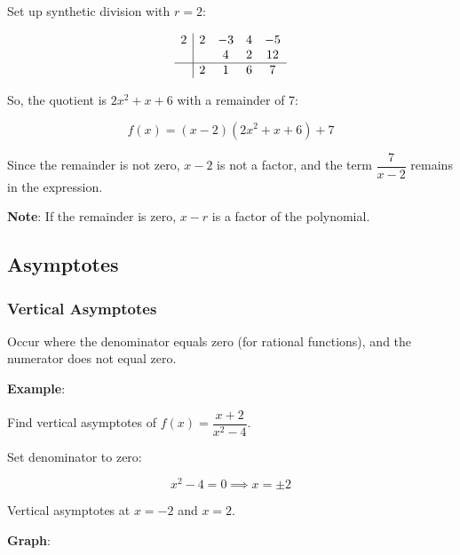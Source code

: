 \documentclass{article}
\begin{document}
\begin{multicols}{2}
Set up synthetic division with \( r = 2 \):

\[
\begin{array}{c|cccc}
2 & 2 & -3 & 4 & -5 \\
&   & 4 & 2 & 12 \\
\hline
& 2 & 1 & 6 & 7
\end{array}
\]

So, the quotient is \( 2x^2 + x + 6 \) with a remainder of 7:

\[
f(x) = (x - 2)(2x^2 + x + 6) + 7
\]

Since the remainder is not zero, \( x - 2 \) is not a factor, and the term \( \dfrac{7}{x - 2} \) remains in the expression.

\textbf{Note}: If the remainder is zero, \( x - r \) is a factor of the polynomial.

\subsection*{Asymptotes}

\subsubsection*{Vertical Asymptotes}

Occur where the denominator equals zero (for rational functions), and the numerator does not equal zero.

\textbf{Example}:

Find vertical asymptotes of \( f(x) = \dfrac{x + 2}{x^2 - 4} \).

Set denominator to zero:

\[
x^2 - 4 = 0 \implies x = \pm 2
\]

Vertical asymptotes at \( x = -2 \) and \( x = 2 \).

\textbf{Graph}:

\begin{center}
\end{center}


\end{multicols}
\end{document}

